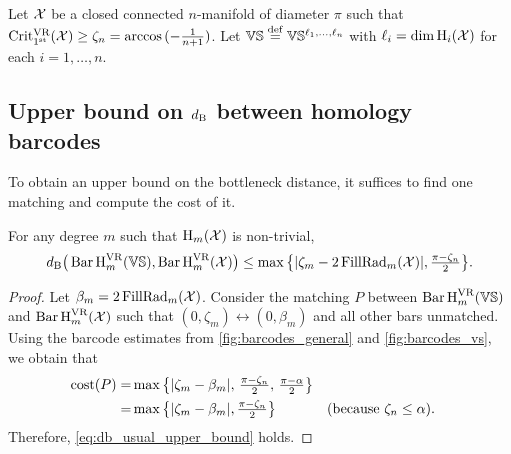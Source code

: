 Let $\cX$ be a closed connected \(n\)-manifold of diameter $\pi$ such that $\crit(\cX) \geq \zeta_n = \arccos{(-\tfrac{1}{n+1})}$.
Let $\VS \defeq \VS^{\ell_1, \dots, \ell_n}$ with $\ell_i = \dim \opH_i(\cX)$ for each $i = 1,\dots, n$.


\subsection{Upper bound on $\db$ between homology barcodes}\label{subsub:db_upper_bound}

To obtain an upper bound on the bottleneck distance, it suffices to find one matching and compute the cost of it.

\medskip\proposition
For any degree $m$ such that $\opH_m(\cX)$ is non-trivial,
\begin{equation}\label{eq:db_usual_upper_bound}
	\db\big(\Hbarc[\field]{m}{\VS}, \Hbarc[\field]{m}{\cX}\big)
	\leq \max\big\{|\zeta_m  - 2\firstdeath{m}{\cX} |, \tfrac{\pi - \zeta_n}{2}\big\}.
\end{equation}

\begin{proof}
    Let $\beta_m = 2\firstdeath{m}{\cX}$.
	Consider the matching $P$ between $\Hbarc[\field]{m}{\VS}$ and $\Hbarc[\field]{m}{\cX}$ such that $(0,\zeta_m ) \leftrightarrow (0, \beta_m )$ and all other bars unmatched.
	Using the barcode estimates from \cref{fig:barcodes_general} and \cref{fig:barcodes_vs}, we obtain that %
	\begin{align*}
		\cost(P)
		= & \max\big\{|\zeta_m  - \beta_m |,\, \tfrac{\pi - \zeta_n}{2},\, \tfrac{\pi - \alpha}{2}\big\} \\
		= & \max\big\{|\zeta_m  - \beta_m |, \tfrac{\pi - \zeta_n}{2}\big\} && \mbox{(because $\zeta_n \leq \alpha$)}.
	\end{align*}
	Therefore, \cref{eq:db_usual_upper_bound} holds.
\end{proof}



